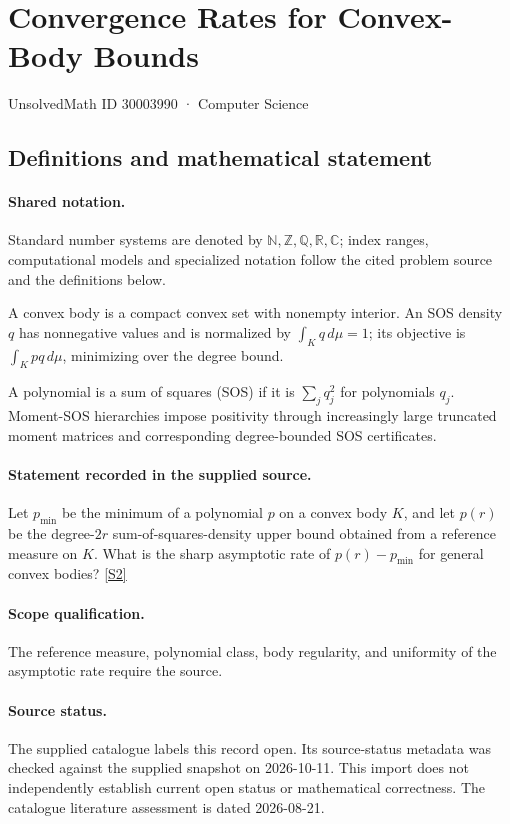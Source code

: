 \documentclass[11pt]{article}
\newcommand{\sref}[2]{\hyperlink{source:#1:#2}{[S#2]}}
\begin{document}
\setcounter{section}{30003989}
\section{Convergence Rates for Convex-Body Bounds}\label{30003990}
{\small\sffamily UnsolvedMath ID 30003990 · Computer Science}
\subsection{Definitions and mathematical statement}

\paragraph{Shared notation.}Standard number systems are denoted by $\mathbb N,\mathbb Z,\mathbb Q,\mathbb R,\mathbb C$; index ranges, computational models and specialized notation follow the cited problem source and the definitions below.


A convex body is a compact convex set with nonempty interior. An SOS density $q$ has nonnegative values and is normalized by $\int_Kq\,d\mu=1$; its objective is $\int_Kp q\,d\mu$, minimizing over the degree bound.

A polynomial is a sum of squares (SOS) if it is $\sum_j q_j^2$ for polynomials $q_j$. Moment-SOS hierarchies impose positivity through increasingly large truncated moment matrices and corresponding degree-bounded SOS certificates.
\paragraph{Statement recorded in the supplied source.}
Let $p_{\min}$ be the minimum of a polynomial $p$ on a convex body $K$, and let $p(r)$ be the degree-$2r$ sum-of-squares-density upper bound obtained from a reference measure on $K$. What is the sharp asymptotic rate of $p(r)-p_{\min}$ for general convex bodies? \sref{30003990}{2}
\paragraph{Scope qualification.}
The reference measure, polynomial class, body regularity, and uniformity of the asymptotic rate require the source.
\paragraph{Source status.}
The supplied catalogue labels this record open. Its source-status metadata was checked against the supplied snapshot on 2026-10-11. This import does not independently establish current open status or mathematical correctness. The catalogue literature assessment is dated 2026-08-21.
\end{document}

